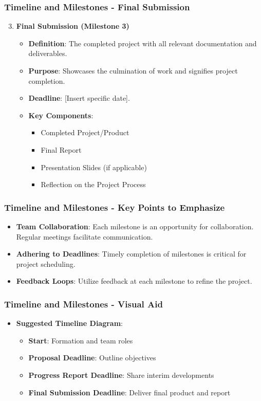 \documentclass{beamer}
\begin{document}
\begin{frame}[fragile]
    \frametitle{Timeline and Milestones - Final Submission}
    \begin{enumerate}
        \setcounter{enumi}{2}
        \item \textbf{Final Submission (Milestone 3)}
        \begin{itemize}
            \item \textbf{Definition}: The completed project with all relevant documentation and deliverables.
            \item \textbf{Purpose}: Showcases the culmination of work and signifies project completion.
            \item \textbf{Deadline}: [Insert specific date].
            \item \textbf{Key Components}:
            \begin{itemize}
                \item Completed Project/Product
                \item Final Report
                \item Presentation Slides (if applicable)
                \item Reflection on the Project Process
            \end{itemize}
        \end{itemize}
    \end{enumerate}
\end{frame}

\begin{frame}[fragile]
    \frametitle{Timeline and Milestones - Key Points to Emphasize}
    \begin{itemize}
        \item \textbf{Team Collaboration}: Each milestone is an opportunity for collaboration. Regular meetings facilitate communication.
        \item \textbf{Adhering to Deadlines}: Timely completion of milestones is critical for project scheduling.
        \item \textbf{Feedback Loops}: Utilize feedback at each milestone to refine the project.
    \end{itemize}
\end{frame}

\begin{frame}[fragile]
    \frametitle{Timeline and Milestones - Visual Aid}
    \begin{itemize}
        \item \textbf{Suggested Timeline Diagram}:
        \begin{itemize}
            \item \textbf{Start}: Formation and team roles
            \item \textbf{Proposal Deadline}: Outline objectives
            \item \textbf{Progress Report Deadline}: Share interim developments
            \item \textbf{Final Submission Deadline}: Deliver final product and report
        \end{itemize}
    \end{itemize}
\end{frame}
\end{document}
